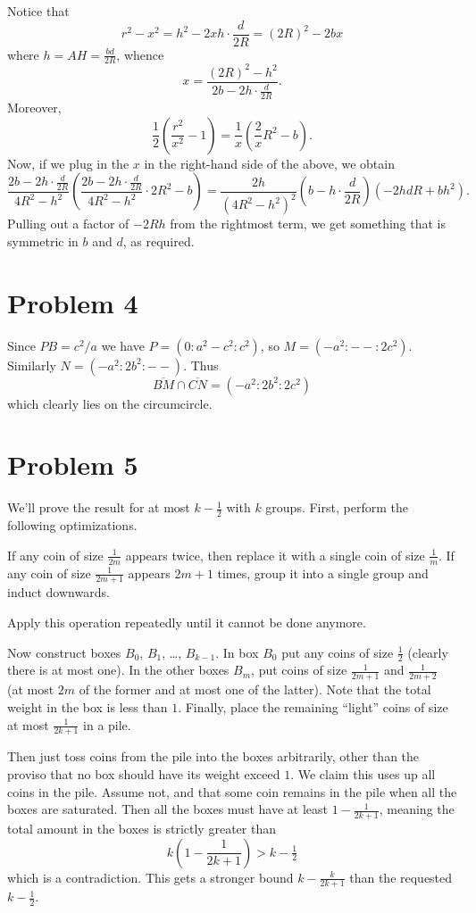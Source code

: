 \documentclass[11pt]{scrreprt}
\numberwithin{figure}{chapter}
\begin{document}
Notice that \[ r^2 - x^2 = h^2 - 2xh \cdot \frac{d}{2R} = (2R)^2 - 2bx \] where $h = AH = \frac{bd}{2R}$, whence \[
x = \frac{(2R)^2-h^2}{2b - 2h \cdot \frac{d}{2R}}.
\] Moreover, \[
  \frac{1}{2} \left(  \frac{r^2}{x^2}-1 \right) = \frac{1}{x} \left( \frac 2x R^2 - b \right).
\]
Now, if we plug in the $x$ in the right-hand side of the above, we obtain
\[ \frac{2b-2h \cdot \frac{d}{2R}}{4R^2-h^2}
  \left( \frac{2b-2h \cdot \frac{d}{2R}}{4R^2-h^2} \cdot 2R^2 - b\right)
  = \frac{2h}{(4R^2-h^2)^2}
  \left( b- h \cdot \frac{d}{2R} \right)
  \left( -2hdR + bh^2  \right). \]
Pulling out a factor of $-2Rh$ from the rightmost term, we get something that is symmetric in $b$ and $d$, as required.



\section{Problem 4}
Since $PB = c^2/a$ we have $P = (0 : a^2-c^2 : c^2)$, so $M = (-a^2 : {--} : 2c^2)$. Similarly $N = (-a^2 : 2b^2 : {--})$. Thus
\[ \overline{BM} \cap \overline{CN} = (-a^2 : 2b^2 : 2c^2) \]
which clearly lies on the circumcircle.


\section{Problem 5}
We'll prove the result for at most $k - \tfrac 12$ with $k$ groups.
First, perform the following optimizations.
\begin{itemize}
  \ii If any coin of size $\frac{1}{2m}$ appears twice, then replace it with a single coin of size $\frac{1}{m}$.
  \ii If any coin of size $\frac{1}{2m+1}$ appears $2m+1$ times, group it into a single group and induct downwards.
\end{itemize}
Apply this operation repeatedly until it cannot be done anymore.

Now construct boxes $B_0$, $B_1$, \dots, $B_{k-1}$.  In box $B_0$ put any coins of size $\tfrac 12$ (clearly there is at most one).
In the other boxes $B_m$, put coins of size $\frac{1}{2m+1}$ and $\frac{1}{2m+2}$ (at most $2m$ of the former and at most one of the latter).
Note that the total weight in the box is less than $1$.
Finally, place the remaining ``light'' coins of size at most $\frac{1}{2k+1}$ in a pile.

Then just toss coins from the pile into the boxes arbitrarily, other than the proviso that no box should have its weight exceed $1$.
We claim this uses up all coins in the pile. Assume not, and that some coin remains in the pile when all the boxes are saturated.
Then all the boxes must have at least $1 -\frac{1}{2k+1}$, meaning the total amount in the boxes is strictly greater than
\[ k \left( 1 - \frac{1}{2k+1} \right) > k - \tfrac 12 \]
which is a contradiction. This gets a stronger bound $k - \frac{k}{2k+1}$ than the requested $k-\tfrac 12$.
\end{document}

